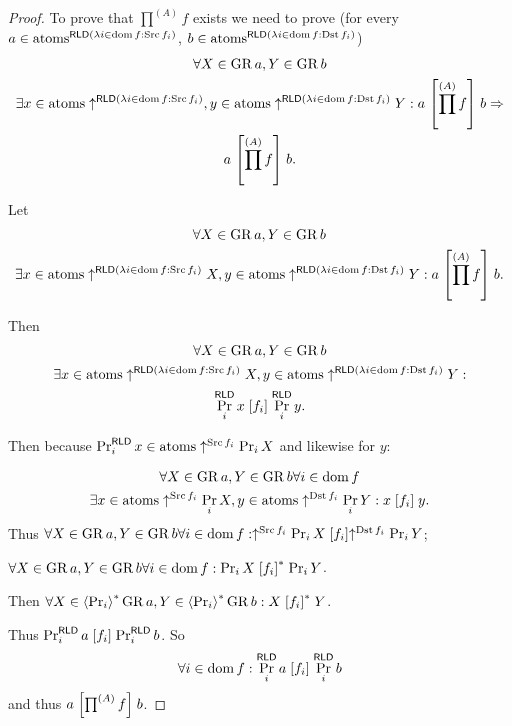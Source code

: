 \begin{proof}
To prove that $\prod^{(A)}f$ exists we need to prove (for every $a\in\atoms^{\mathsf{RLD}(\mylamdba i{\dom f}{\Src f_{i}})}$,
$b\in\atoms^{\mathsf{RLD}(\mylamdba i{\dom f}{\Dst f_{i}})}$)
\begin{multline*}
\forall X\in\GR a,Y\in\GR b\\
\exists x\in\atoms\uparrow^{\mathsf{RLD}(\mylamdba i{\dom f}{\Src f_{i}})},y\in\atoms\uparrow^{\mathsf{RLD}(\mylamdba i{\dom f}{\Dst f_{i}})}Y:a\suprel{\prod^{(A)}f}b\Rightarrow\\
a\suprel{\prod^{(A)}f}b.
\end{multline*}


Let
\begin{multline*}
\forall X\in\GR a,Y\in\GR b\\
\exists x\in\atoms\uparrow^{\mathsf{RLD}(\mylamdba i{\dom f}{\Src f_{i}})}X,y\in\atoms\uparrow^{\mathsf{RLD}(\mylamdba i{\dom f}{\Dst f_{i}})}Y:a\suprel{\prod^{(A)}f}b.
\end{multline*}


Then
\begin{multline*}
\forall X\in\GR a,Y\in\GR b\\
\exists x\in\atoms\uparrow^{\mathsf{RLD}(\mylamdba i{\dom f}{\Src f_{i}})}X,y\in\atoms\uparrow^{\mathsf{RLD}(\mylamdba i{\dom f}{\Dst f_{i}})}Y:\\
\Pr_{i}^{\mathsf{RLD}}x\suprel{f_i}\Pr_{i}^{\mathsf{RLD}}y.
\end{multline*}


Then because $\Pr_{i}^{\mathsf{RLD}}x\in\atoms\uparrow^{\Src f_{i}}\Pr_{i}X$
and likewise for $y$:

\begin{multline*}
\forall X\in\GR a,Y\in\GR b\forall i\in\dom f\\
\exists x\in\atoms\uparrow^{\Src f_{i}}\Pr_{i}X,y\in\atoms\uparrow^{\Dst f_{i}}\Pr_{i}Y:x\suprel{f_{i}}y.
\end{multline*}
Thus $\forall X\in\GR a,Y\in\GR b\forall i\in\dom f:\uparrow^{\Src f_{i}}\Pr_{i}X\suprel{f_{i}}\uparrow^{\Dst f_{i}}\Pr_{i}Y$;

$\forall X\in\GR a,Y\in\GR b\forall i\in\dom f:\Pr_{i}X\rsuprel{f_{i}}\Pr_{i}Y$.

Then $\forall X\in\rsupfun{\Pr_{i}}\GR a,Y\in\rsupfun{\Pr_{i}}\GR b:X\rsuprel{f_{i}}Y$.

Thus $\Pr_{i}^{\mathsf{RLD}}a\suprel{f_{i}}\Pr_{i}^{\mathsf{RLD}}b$.
So 
\[
\forall i\in\dom f:\Pr_{i}^{\mathsf{RLD}}a\suprel{f_{i}}\Pr_{i}^{\mathsf{RLD}}b
\]
and thus $a\suprel{\prod^{(A)}f}b$.\end{proof}
